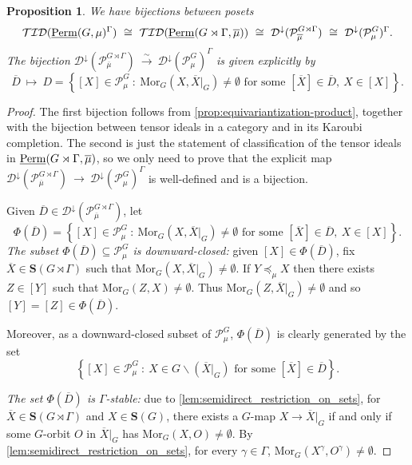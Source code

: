 \documentclass[11pt,a4paper]{amsart}
\theoremstyle{plain}%
\newtheorem{proposition}[lemma]{Proposition}
\theoremstyle{definition}
\theoremstyle{remark}
\newcommand{\Perm}{\underline{{\rm Perm}}}
\newcommand{\Down}{\mathcal{D}^{\downarrow}}
\newcommand{\Set}[1]{\mathbf{S}(#1)}
\begin{document}
\begin{proposition}\label{prop:equivariantization-ideals}
    We have bijections between posets 
    $$\mathcal{TID}(\Perm(G, \mu)^{\Gamma})~\cong~ \mathcal{TID}(\Perm(G\rtimes \Gamma, \overline{\mu}))~\cong~ \Down(\mathcal{P}^{G\rtimes \Gamma}_{\overline{\mu}})~\cong ~\Down(\mathcal{P}^G_\mu)^{\Gamma}.$$
    The bijection $\Down(\mathcal{P}^{G\rtimes \Gamma}_{\overline{\mu}}) ~\xrightarrow{\sim}~ \Down(\mathcal{P}^G_\mu)^{\Gamma}$ is given explicitly by 
    \[\overline{D}~\longmapsto~ D=\left\{[X]\in \mathcal{P}^G_\mu~:~\mathrm{Mor}_G(X, \overline{X}\rvert_G)\neq \emptyset  \text{ for some } [\overline{X}]\in \overline{D}, ~ X\in [X]\right\}.\]
\end{proposition}
\begin{proof}
    The first bijection follows from \cref{prop:equivariantization-product}, together with the bijection between tensor ideals in a category and in its Karoubi completion. The second is just the statement of classification of the tensor ideals in $\Perm(G\rtimes \Gamma, \overline{\mu})$, so we only need to prove that the explicit map $\Down(\mathcal{P}^{G\rtimes \Gamma}_{\overline{\mu}}) ~\xrightarrow{}~ \Down(\mathcal{P}^G_\mu)^{\Gamma}$ is well-defined and is a bijection. 

    Given $\overline{D}\in \Down(\mathcal{P}^{G\rtimes \Gamma}_{\overline{\mu}})$, let 
    \[\Phi(\overline{D})=\left\{[X]\in \mathcal{P}^G_\mu~:~\mathrm{Mor}_G(X, \overline{X}\rvert_G)\neq \emptyset  \text{ for some } [\overline{X}]\in \overline{D}, ~ X\in [X]\right\}.\]
{\it The subset $\Phi(\overline{D})\subseteq \mathcal{P}^G_\mu$ is downward-closed:} given $[X]\in \Phi(\overline{D})$, fix $\overline{X}\in \Set{G\rtimes \Gamma}$ such that $\mathrm{Mor}_G(X, \overline{X}\rvert_G)\neq \emptyset$. If $Y\preceq_{\mu} X$ then there exists $Z\in [Y]$ such that $\mathrm{Mor}_G(Z, X)\neq \emptyset$. Thus $\mathrm{Mor}_G(Z,  \overline{X}\rvert_G)\neq \emptyset$ and so $[Y]=[Z] \in \Phi(\overline{D})$.

Moreover, as a downward-closed subset of $\mathcal{P}^G_{\mu}$, $\Phi(\overline{D})$ is clearly generated by the set $$\left\{[X]\in \mathcal{P}^G_\mu~:~ X\in G\backslash (\overline{X}\rvert_G)  \text{ for some } [\overline{X}]\in \overline{D}\right\}.$$

{\it The set $\Phi(\overline{D})$ is $\Gamma$-stable:} due to \cref{lem:semidirect_restriction_on_sets}, for $\overline{X} \in \Set{G\rtimes \Gamma}$ and $X\in \Set{G}$, there exists a $G$-map $X\to \overline{X}\rvert_G$ if and only if some $G$-orbit $O$ in $\overline{X}\rvert_G$ has $\mathrm{Mor}_G(X, O)\neq \emptyset$. By \cref{lem:semidirect_restriction_on_sets}, for every $\gamma\in \Gamma$, $\mathrm{Mor}_G(X^{\gamma},O^{\gamma})\neq \emptyset$. 


\end{proof}
\end{document}

